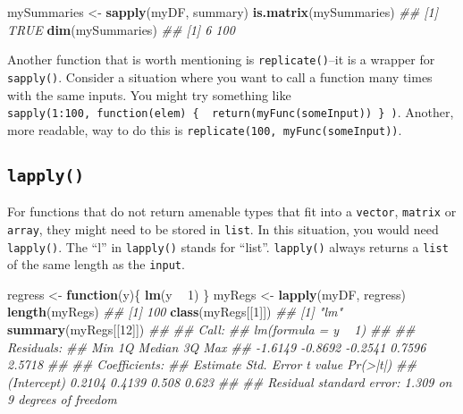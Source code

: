 \documentclass[12pt,krantz2]{krantz}
\makeatletter
\newenvironment{Shaded}{\begin{snugshade}}{\end{snugshade}}
\newcommand{\CommentTok}[1]{\textcolor[rgb]{0.37,0.37,0.37}{\textit{#1}}}
\newcommand{\ControlFlowTok}[1]{\textcolor[rgb]{0.27,0.27,0.27}{\textbf{#1}}}
\newcommand{\DecValTok}[1]{\textcolor[rgb]{0.06,0.06,0.06}{#1}}
\newcommand{\KeywordTok}[1]{\textcolor[rgb]{0.27,0.27,0.27}{\textbf{#1}}}
\newcommand{\NormalTok}[1]{#1}
\newcommand{\OperatorTok}[1]{\textcolor[rgb]{0.43,0.43,0.43}{\textbf{#1}}}
\newcommand{\StringTok}[1]{\textcolor[rgb]{0.5,0.5,0.5}{#1}}
\newenvironment{kframe}{%
\medskip{}
\setlength{\fboxsep}{.8em}
 \def\at@end@of@kframe{}%
 \ifinner\ifhmode%
  \def\at@end@of@kframe{\end{minipage}}%
  \begin{minipage}{\columnwidth}%
 \fi\fi%
 \def\FrameCommand##1{\hskip\@totalleftmargin \hskip-\fboxsep
 \colorbox{shadecolor}{##1}\hskip-\fboxsep
     \hskip-\linewidth \hskip-\@totalleftmargin \hskip\columnwidth}%
 \MakeFramed {\advance\hsize-\width
   \@totalleftmargin\z@ \linewidth\hsize
   \@setminipage}}%
 {\par\unskip\endMakeFramed%
 \at@end@of@kframe}
\renewenvironment{Shaded}{\begin{kframe}}{\end{kframe}}
\makeatother
\begin{document}
\begin{Shaded}
\begin{Highlighting}[]
\NormalTok{mySummaries <-}\StringTok{ }\KeywordTok{sapply}\NormalTok{(myDF, summary)}
\KeywordTok{is.matrix}\NormalTok{(mySummaries)}
\CommentTok{## [1] TRUE}
\KeywordTok{dim}\NormalTok{(mySummaries)}
\CommentTok{## [1]   6 100}
\end{Highlighting}
\end{Shaded}

\begin{rmd-details}
Another function that is worth mentioning is \texttt{replicate()}--it is a wrapper for \texttt{sapply()}. Consider a situation where you want to call a function many times with the same inputs. You might try something like \texttt{sapply(1:100,\ function(elem)\ \{\ \ return(myFunc(someInput))\ \}\ )}. Another, more readable, way to do this is \texttt{replicate(100,\ myFunc(someInput))}.

\end{rmd-details}

\hypertarget{lapply}{%
\subsection{\texorpdfstring{\texttt{lapply()}}{lapply()}}\label{lapply}}

For functions that do not return amenable types that fit into a \texttt{vector}, \texttt{matrix} or \texttt{array}, they might need to be stored in \texttt{list}. In this situation, you would need \texttt{lapply()}. The ``l'' in \texttt{lapply()} stands for ``list''. \texttt{lapply()} always returns a \texttt{list} of the same length as the \texttt{input}.

\begin{Shaded}
\begin{Highlighting}[]
\NormalTok{regress <-}\StringTok{ }\ControlFlowTok{function}\NormalTok{(y)\{ }\KeywordTok{lm}\NormalTok{(y }\OperatorTok{~}\StringTok{ }\DecValTok{1}\NormalTok{) \}}
\NormalTok{myRegs <-}\StringTok{ }\KeywordTok{lapply}\NormalTok{(myDF, regress)}
\KeywordTok{length}\NormalTok{(myRegs)}
\CommentTok{## [1] 100}
\KeywordTok{class}\NormalTok{(myRegs[[}\DecValTok{1}\NormalTok{]])}
\CommentTok{## [1] "lm"}
\KeywordTok{summary}\NormalTok{(myRegs[[}\DecValTok{12}\NormalTok{]])}
\CommentTok{## }
\CommentTok{## Call:}
\CommentTok{## lm(formula = y ~ 1)}
\CommentTok{## }
\CommentTok{## Residuals:}
\CommentTok{##     Min      1Q  Median      3Q     Max }
\CommentTok{## -1.6149 -0.8692 -0.2541  0.7596  2.5718 }
\CommentTok{## }
\CommentTok{## Coefficients:}
\CommentTok{##             Estimate Std. Error t value Pr(>|t|)}
\CommentTok{## (Intercept)   0.2104     0.4139   0.508    0.623}
\CommentTok{## }
\CommentTok{## Residual standard error: 1.309 on 9 degrees of freedom}
\end{Highlighting}
\end{Shaded}
\end{document}
